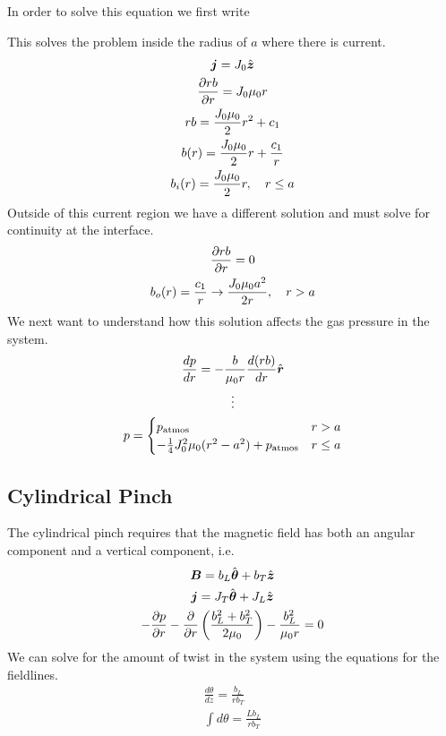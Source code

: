 \documentclass{article}
\begin{document}
In order to solve this equation we first write

This solves the problem inside the radius of $a$ where there is current.
\begin{gather*}
    \boldsymbol{j} = J_0\hat{\boldsymbol{z}} \\
    \frac{\partial rb}{\partial r} = J_0\mu_0r\\
    rb = \frac{J_0\mu_0}{2}r^2 + c_1\\
    b(r) = \frac{J_0\mu_0}{2}r + \frac{c_1}{r}\\
    b_i(r) = \frac{J_0\mu_0}{2}r, \quad r \le a
\end{gather*}
Outside of this current region we have a different solution and must solve for
continuity at the interface. 
\begin{gather*}
    \frac{\partial rb}{\partial r} = 0\\
    b_o(r) = \frac{c_1}{r} \to \frac{J_0\mu_0 a^2}{2r}, \quad r > a
\end{gather*}
We next want to understand how this solution affects the gas pressure in the
system. 
\begin{gather*}
    \frac{dp}{dr} = -\frac{b}{\mu_0r}\frac{d(rb)}{dr}\hat{\boldsymbol{r}}\\
    \vdots\\
    p = \begin{cases}
        p_{\text{atmos}} & r > a\\
        -\frac{1}{4}J_0^2\mu_0(r^2-a^2)+p_{\text{atmos}} & r \le a\end{cases}
\end{gather*}

\subsection{Cylindrical Pinch}
The cylindrical pinch requires that the magnetic field has both an angular
component and a vertical component, i.e. 
\begin{gather*}
    \boldsymbol{B} = b_L\hat{\boldsymbol{\theta}} + b_T\hat{\boldsymbol{z}}\\
    \boldsymbol{j} = J_T\hat{\boldsymbol{\theta}} + J_L\hat{\boldsymbol{z}}\\
    -\frac{\partial p}{\partial r} - \frac{\partial }{\partial r}\left(\frac{b_L^2 + b_T^2}{2\mu_0}\right) -
    \frac{b_L^2}{\mu_0r} = 0
\end{gather*}
We can solve for the amount of twist in the system using the equations for the
fieldlines. 
\begin{gather*}
    \frac{d\theta}{dz} = \frac{b_L}{rb_T}\\
    \int d\theta = \frac{Lb_L}{rb_T}
\end{gather*}
\end{document}
